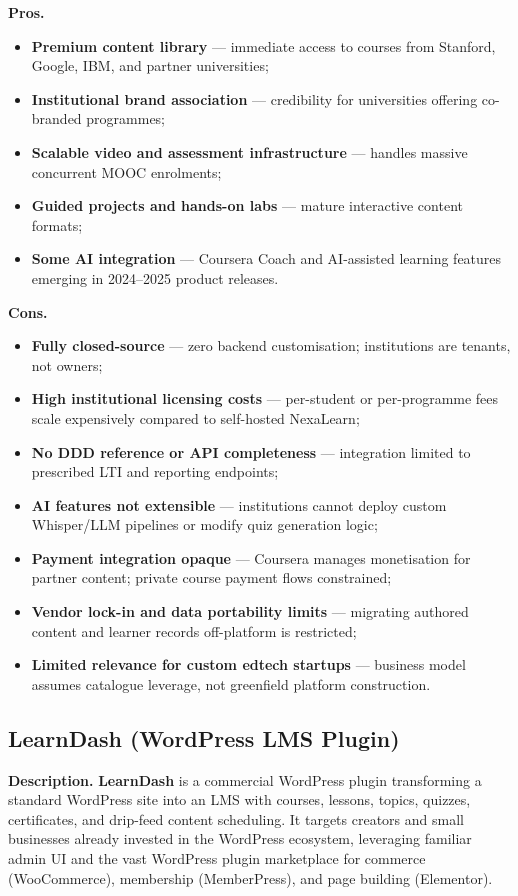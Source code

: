 \textbf{Pros.}
\begin{itemize}
  \item \textbf{Premium content library} --- immediate access to courses from Stanford, Google, IBM, and partner universities;
  \item \textbf{Institutional brand association} --- credibility for universities offering co-branded programmes;
  \item \textbf{Scalable video and assessment infrastructure} --- handles massive concurrent MOOC enrolments;
  \item \textbf{Guided projects and hands-on labs} --- mature interactive content formats;
  \item \textbf{Some AI integration} --- Coursera Coach and AI-assisted learning features emerging in 2024--2025 product releases.
\end{itemize}

\textbf{Cons.}
\begin{itemize}
  \item \textbf{Fully closed-source} --- zero backend customisation; institutions are tenants, not owners;
  \item \textbf{High institutional licensing costs} --- per-student or per-programme fees scale expensively compared to self-hosted NexaLearn;
  \item \textbf{No DDD reference or API completeness} --- integration limited to prescribed LTI and reporting endpoints;
  \item \textbf{AI features not extensible} --- institutions cannot deploy custom Whisper/LLM pipelines or modify quiz generation logic;
  \item \textbf{Payment integration opaque} --- Coursera manages monetisation for partner content; private course payment flows constrained;
  \item \textbf{Vendor lock-in and data portability limits} --- migrating authored content and learner records off-platform is restricted;
  \item \textbf{Limited relevance for custom edtech startups} --- business model assumes catalogue leverage, not greenfield platform construction.
\end{itemize}

\subsection{LearnDash (WordPress LMS Plugin)}
\label{subsec:learndash}

\textbf{Description.}
\textbf{LearnDash} is a commercial WordPress plugin transforming a standard WordPress site into an LMS with courses, lessons, topics, quizzes, certificates, and drip-feed content scheduling. It targets creators and small businesses already invested in the WordPress ecosystem, leveraging familiar admin UI and the vast WordPress plugin marketplace for commerce (WooCommerce), membership (MemberPress), and page building (Elementor).

